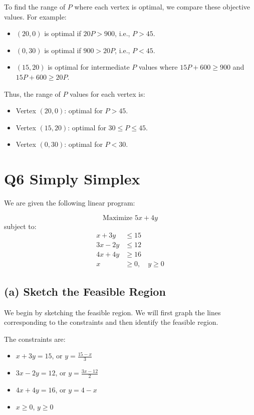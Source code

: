 \documentclass[11pt]{article}
\begin{document}
To find the range of \( P \) where each vertex is optimal, we compare these objective values. For example:
\begin{itemize}
    \item \( (20, 0) \) is optimal if \( 20P > 900 \), i.e., \( P > 45 \).
    \item \( (0, 30) \) is optimal if \( 900 > 20P \), i.e., \( P < 45 \).
    \item \( (15, 20) \) is optimal for intermediate \( P \) values where \( 15P + 600 \geq 900 \) and \( 15P + 600 \geq 20P \).
\end{itemize}

Thus, the range of \( P \) values for each vertex is:
\begin{itemize}
    \item Vertex \( (20, 0) \): optimal for \( P > 45 \).
    \item Vertex \( (15, 20) \): optimal for \( 30 \leq P \leq 45 \).
    \item Vertex \( (0, 30) \): optimal for \( P < 30 \).
\end{itemize}


\newpage


\section*{Q6 Simply Simplex}

We are given the following linear program:

\[
\text{Maximize } 5x + 4y
\]
subject to:
\[
\begin{aligned}
    x + 3y &\leq 15 \\
    3x - 2y &\leq 12 \\
    4x + 4y &\geq 16 \\
    x &\geq 0, \quad y \geq 0
\end{aligned}
\]

\subsection*{(a) Sketch the Feasible Region}

We begin by sketching the feasible region. We will first graph the lines corresponding to the constraints and then identify the feasible region.

The constraints are:
\begin{itemize}
    \item \( x + 3y = 15 \), or \( y = \frac{15 - x}{3} \)
    \item \( 3x - 2y = 12 \), or \( y = \frac{3x - 12}{2} \)
    \item \( 4x + 4y = 16 \), or \( y = 4 - x \)
    \item \( x \geq 0 \), \( y \geq 0 \)
\end{itemize}
\end{document}
